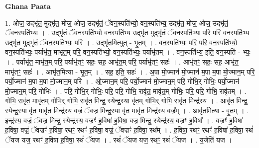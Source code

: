 \documentclass[17pt]{extarticle}
\begin{document}
\textbf{Ghana Paata } \newline

1. ओज॒ उद्भृ॑त॒ मुद्भृ॑त॒ मोज॒ ओज॒ उद्भृ॑तं॒ ॅवन॒स्पति॑भ्यो॒ वन॒स्पति॑भ्य॒ उद्भृ॑त॒ मोज॒ ओज॒ उद्भृ॑तं॒ ॅवन॒स्पति॑भ्यः । . उद्भृ॑तं॒ ॅवन॒स्पति॑भ्यो॒ वन॒स्पति॑भ्य॒ उद्भृ॑त॒ मुद्भृ॑तं॒ ॅवन॒स्पति॑भ्यः॒ परि॒ परि॒ वन॒स्पति॑भ्य॒ उद्भृ॑त॒ मुद्भृ॑तं॒ ॅवन॒स्पति॑भ्यः॒ परि॑ । . उद्भृ॑त॒मित्युत् - भृ॒त॒म् । . वन॒स्पति॑भ्यः॒ परि॒ परि॒ वन॒स्पति॑भ्यो॒ वन॒स्पति॑भ्यः॒ पर्याभृ॑त॒ माभृ॑त॒म् परि॒ वन॒स्पति॑भ्यो॒ वन॒स्पति॑भ्यः॒ पर्याभृ॑तम् । . वन॒स्पति॑भ्य॒ इति॒ वन॒स्पति॑ - भ्यः॒ । . पर्याभृ॑त॒ माभृ॑त॒म् परि॒ पर्याभृ॑तꣳ॒॒ सहः॒ सह॒ आभृ॑त॒म् परि॒ पर्याभृ॑तꣳ॒॒ सहः॑ । . आभृ॑तꣳ॒॒ सहः॒ सह॒ आभृ॑त॒ माभृ॑तꣳ॒॒ सहः॑ । . आभृ॑त॒मित्या - भृ॒त॒म् । . सह॒ इति॒ सहः॑ । . अ॒पा मो॒ज्मान॑ मो॒ज्मान॑ म॒पा म॒पा मो॒ज्मान॒म् परि॒ पर्यो॒ज्मान॑ म॒पा म॒पा मो॒ज्मान॒म् परि॑ । . ओ॒ज्मान॒म् परि॒ पर्यो॒ज्मान॑ मो॒ज्मान॒म् परि॒ गोभि॒र् गोभिः॒ पर्यो॒ज्मान॑ मो॒ज्मान॒म् परि॒ गोभिः॑ । . परि॒ गोभि॒र् गोभिः॒ परि॒ परि॒ गोभि॒ रावृ॑त॒ मावृ॑त॒म् गोभिः॒ परि॒ परि॒ गोभि॒ रावृ॑तम् । . गोभि॒ रावृ॑त॒ मावृ॑त॒म् गोभि॒र् गोभि॒ रावृ॑त॒ मिन्द्र॒ स्येन्द्र॒स्या वृ॑त॒म् गोभि॒र् गोभि॒ रावृ॑त॒ मिन्द्र॑स्य । . आवृ॑त॒ मिन्द्र॒ स्येन्द्र॒स्या वृ॑त॒ मावृ॑त॒ मिन्द्र॑स्य॒ वज्रं॒ ॅवज्र॒ मिन्द्र॒स्या वृ॑त॒ मावृ॑त॒ मिन्द्र॑स्य॒ वज्र᳚म् । . आवृ॑त॒मित्या - वृ॒त॒म् । . इन्द्र॑स्य॒ वज्रं॒ ॅवज्र॒ मिन्द्र॒ स्येन्द्र॑स्य॒ वज्रꣳ॑ ह॒विषा॑ ह॒विषा॒ वज्र॒ मिन्द्र॒ स्येन्द्र॑स्य॒ वज्रꣳ॑ ह॒विषा᳚ । . वज्रꣳ॑ ह॒विषा॑ ह॒विषा॒ वज्रं॒ ॅवज्रꣳ॑ ह॒विषा॒ रथꣳ॒॒ रथꣳ॑ ह॒विषा॒ वज्रं॒ ॅवज्रꣳ॑ ह॒विषा॒ रथ᳚म् । . ह॒विषा॒ रथꣳ॒॒ रथꣳ॑ ह॒विषा॑ ह॒विषा॒ रथं॑ ॅयज यज॒ रथꣳ॑ ह॒विषा॑ ह॒विषा॒ रथं॑ ॅयज । . रथं॑ ॅयज यज॒ रथꣳ॒॒ रथं॑ ॅयज । . य॒जेति॑ यज । \newline
\end{document}
